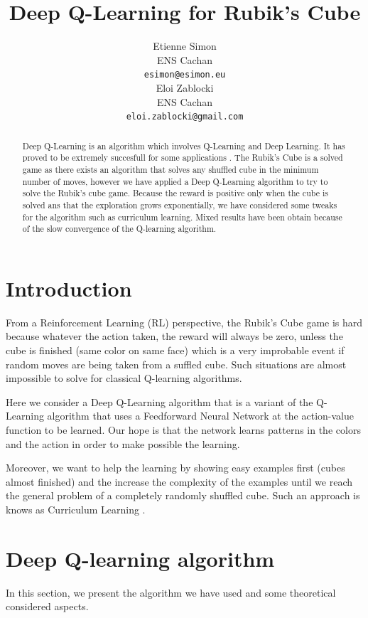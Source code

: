 \documentclass{article} %
\title{Deep Q-Learning for Rubik's Cube}
\author{
Etienne Simon\\
ENS Cachan\\
\texttt{esimon@esimon.eu} \\
\And
Eloi Zablocki \\
ENS Cachan \\
\texttt{eloi.zablocki@gmail.com} \\
}
\begin{document}
\maketitle

\begin{abstract}
Deep Q-Learning is an algorithm which involves Q-Learning and Deep Learning. It has proved to be extremely succesfull for some applications \cite{deepmind}. The Rubik's Cube is a solved game as there exists an algorithm that solves any shuffled cube in the minimum number of moves, however we have applied a Deep Q-Learning algorithm to try to solve the Rubik's cube game. Because the reward is positive only when the cube is solved ans that the exploration grows exponentially, we have considered some tweaks for the algorithm such as curriculum learning. Mixed results have been obtain because of the slow convergence of the Q-learning algorithm.

\end{abstract}

\section{Introduction}
From a Reinforcement Learning (RL) perspective, the Rubik's Cube game is hard because whatever the action taken, the reward will always be zero, unless the cube is finished (same color on same face) which is a very improbable event if random moves are being taken from a suffled cube. Such situations are almost impossible to solve for classical Q-learning algorithms.

Here we consider a Deep Q-Learning algorithm that is a variant of the Q-Learning algorithm that uses a Feedforward Neural Network at the action-value function to be learned. Our hope is that the network learns patterns in the colors and the action in order to make possible the learning.

Moreover, we want to help the learning by showing easy examples first (cubes almost finished) and the increase the complexity of the examples until we reach the general problem of a completely randomly shuffled cube. Such an approach is knows as Curriculum Learning \cite{curriculum}.


\section{Deep Q-learning algorithm}

In this section, we present the algorithm we have used and some theoretical considered aspects.
\end{document}
